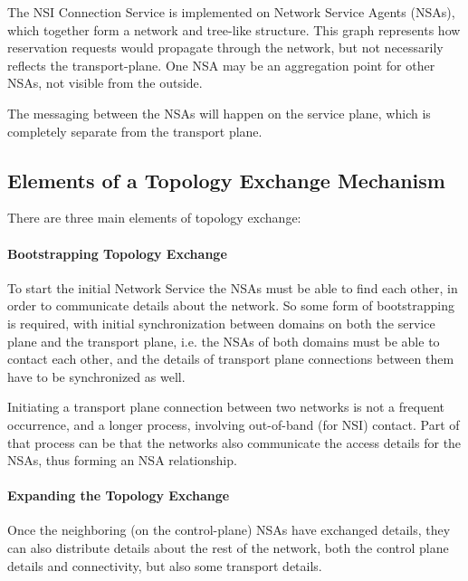 \documentclass[12pt]{article}  %
\begin{document}
 The NSI Connection Service is implemented on Network Service Agents 
(NSAs), which together form a network and tree-like structure. This graph represents 
how reservation requests would propagate through the network, but not necessarily 
reflects the transport-plane. One NSA may be an aggregation point for other NSAs, 
not visible from the outside.\label{h.mtia1ajwgzmv}


The messaging between the NSAs will happen on the 
service plane, which is completely separate from the transport plane.\label{h.dc66uw3zo12t}\label{h.ywjdj9kuwkou}


\subsection{Elements of a Topology Exchange Mechanism}

 There are three main elements of topology exchange: \label{h.u0b214m8krs}


\paragraph{Bootstrapping Topology Exchange}

 To start the initial Network Service the NSAs must be able to 
find each other, in order to communicate details about the network. So some form 
of bootstrapping is required, with initial synchronization between domains on both 
the service plane and the transport plane, i.e. the NSAs of both domains must be 
able to contact each other, and the details of transport plane connections between 
them have to be synchronized as well.\label{h.fzohc79rts8y}


Initiating a transport plane connection between two 
networks is not a frequent occurrence, and a longer process, involving out-of-band 
(for NSI) contact. Part of that process can be that the networks also communicate 
the access details for the NSAs, thus forming an NSA relationship.\label{h.30v92h80y7jj}


\paragraph{Expanding the Topology Exchange}

 Once the neighboring (on the control-plane) NSAs have exchanged 
details, they can also distribute details about the rest of the network, both the 
control plane details and connectivity, but also some transport details.\label{h.c1dz1g10oju}
\end{document}
